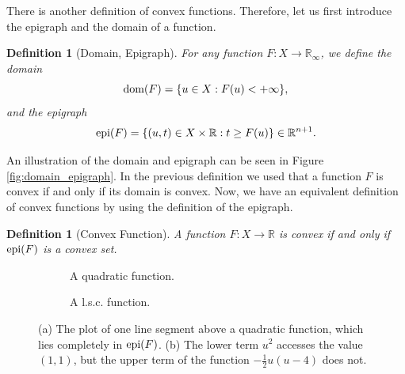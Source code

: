 \documentclass[abstracton]{scrreprt}
\newtheorem{definition}[theorem]{Definition}
\begin{document}
        There is another definition of convex functions. Therefore, let us first introduce the epigraph and the domain of a function.
        \begin{definition}[Domain, Epigraph] %
        \label{def:domain_epigraph}
            For any function $F: X \longrightarrow \mathbb{R}_{\infty}$, we define the domain
                $$
                    \textnormal{dom}(F) = \{ u \in X : F(u) < +\infty \},
                $$
            and the epigraph
                $$
                    \textnormal{epi}(F) = \{ (u, t) \in X \times \mathbb{R}: t \ge F(u) \} \in \mathbb{R}^{n+1}.
                $$
        \end{definition}
        An illustration of the domain and epigraph can be seen in Figure \ref{fig:domain_epigraph}. In the previous definition we used that a function $F$ is convex if and only if its domain is convex. Now, we have an equivalent definition of convex functions by using the definition of the epigraph.
        \begin{definition}[Convex Function] %
        \label{def:convex_function_else}
            A function $F: X \longrightarrow \mathbb{R}$ is convex if and only if $\textnormal{epi}(F)$ is a convex set.
        \end{definition}
        \begin{figure}[!ht]
            \centering
            \begin{subfigure}[b]{0.4\textwidth}
            \caption{A quadratic function.}
            \end{subfigure}
            \begin{subfigure}[b]{0.4\textwidth}
            \caption{A l.s.c. function.}
            \end{subfigure}
            \caption[Example of a convex and a l.s.c. function.]{(a) The plot of one line segment above a quadratic function, which lies completely in $\textnormal{epi}(F)$. (b) The lower term $u^{2}$ accesses the value $(1,1)$, but the upper term of the function $-\frac{1}{2}u(u-4)$ does not.}
            \label{fig:convex_function}
        \end{figure}
\end{document}
